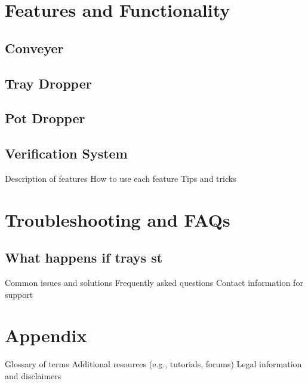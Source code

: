 \documentclass{article}
\begin{document}
\section{Features and Functionality}
\subsection{Conveyer}
\subsection{Tray Dropper}
\subsection{Pot Dropper}
\subsection{Verification System}
Description of features
How to use each feature
Tips and tricks

\section{Troubleshooting and FAQs}
\subsection{What happens if trays st}

Common issues and solutions
Frequently asked questions
Contact information for support

\section{Appendix}

Glossary of terms
Additional resources (e.g., tutorials, forums)
Legal information and disclaimers
\end{document}
